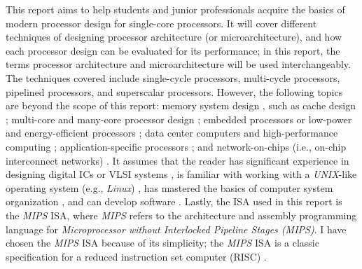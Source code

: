 This report aims to help students and junior professionals acquire the basics of modern processor design for single-core processors. It will cover different techniques of designing processor architecture (or microarchitecture), and how each processor design can be evaluated for its performance; in this report, the terms processor architecture and microarchitecture will be used interchangeably. The techniques covered include single-cycle processors, multi-cycle processors, pipelined processors, and superscalar processors. However, the following topics are beyond the scope of this report: memory system design \cite{Jacob2008,Jacob2009,Sorin2011}, such as cache design \cite{Balasubramonian2011}; multi-core and many-core processor design \cite{Keckler2009,Dubois2012,Olukotun2007,Hubner2011,Culler1999,Nemirovsky2013}; embedded processors \cite{Kornaros2010,Nurmi2007,Jerraya2005,Sriram2009,Wolf2007,Ienne2007} or low-power and energy-efficient processors \cite{Oklobdzija2006,Kaxiras2008}; data center computers \cite{Barroso2013,Abts2011} and high-performance computing \cite{Levesque2011,Yang2006,Hager2011,Lanzagorta2009}; application-specific processors \cite{Hager2011,Kempf2011,Bhattacharyya2010,Fisher2005,Crowley2003,Crowley2004,Crowley2005,Giladi2008,Lekkas2003,Henkel2007,Kim2012}; and network-on-chips (i.e., on-chip interconnect networks) \cite{Dally2004,DeMicheli2006,Gebali2009,Jantsch2003,Jerger2009,Chen2012b,Cota2012,Flich2011,Murali2009,Nicopoulos2009,Nurmi2004,Ogras2013,Pasricha2008,Phan2012,Silvano2011}. It assumes that the reader has significant experience in designing digital ICs or VLSI systems \cite{Arora2012,Kang2003a,Rabaey2003,Weste2011,Wolf2009}, is familiar with working with a {\it UNIX}-like operating system (e.g., {\it Linux}) \cite{Blum2008,Petersen2008,Rosen2007a}, has mastered the basics of computer system organization \cite{Patterson2009,Stallings2013,Tanenbaum2013,Dandamudi2003,AbdElBarr2005}, and can develop software \cite{Pressman2010,Schach2008,Bruegge2010,Sommerville2007}. Lastly, the ISA used in this report is the {\it MIPS} ISA, where {\it MIPS} refers to the architecture and assembly programming language for {\it Microprocessor without Interlocked Pipeline Stages (MIPS)}. I have chosen the {\it MIPS} ISA because of its simplicity; the {\it MIPS} ISA is a classic specification for a reduced instruction set computer (RISC) \cite{Hennessy2012,Patterson2009,Sweetman2007}. \\


